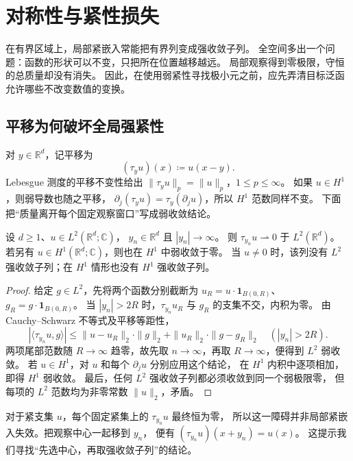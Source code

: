\section{对称性与紧性损失}
\label{b2:sec:app-F-1}

在有界区域上，局部紧嵌入常能把有界列变成强收敛子列。
全空间多出一个问题：函数的形状可以不变，只把所在位置越移越远。
局部观察得到零极限，守恒的总质量却没有消失。
因此，在使用弱紧性寻找极小元之前，应先弄清目标泛函允许哪些不改变数值的变换。

\subsection{平移为何破坏全局强紧性}
\label{b2:subsec:F0101}

对 \(y\in\mathbb R^d\)，记平移为
\[
 (\tau_yu)(x)\coloneqq u(x-y).
\]
Lebesgue 测度的平移不变性给出
\(\|\tau_yu\|_p=\|u\|_p\)，\(1\le p\le\infty\)。
如果 \(u\in H^1\)，则弱导数也随之平移，
\(\partial_j(\tau_yu)=\tau_y(\partial_ju)\)，所以 \(H^1\) 范数同样不变。
下面把“质量离开每个固定观察窗口”写成弱收敛结论。

\begin{proposition}[平移列的弱极限]
\label{b2:prop:F-translation-loss}
设 \(d\ge1\)、\(u\in L^2(\mathbb R^d;\mathbb C)\)，
\(y_n\in\mathbb R^d\) 且 \(|y_n|\to\infty\)。
则 \(\tau_{y_n}u\rightharpoonup0\) 于 \(L^2(\mathbb R^d)\)。
若另有 \(u\in H^1(\mathbb R^d;\mathbb C)\)，则也在 \(H^1\) 中弱收敛于零。
当 \(u\ne0\) 时，该列没有 \(L^2\) 强收敛子列；在 \(H^1\) 情形也没有 \(H^1\) 强收敛子列。
\end{proposition}
\begin{proof}
给定 \(g\in L^2\)，先将两个函数分别截断为
\(u_R=u\cdot\mathbf1_{B(0,R)}\)、
\(g_R=g\cdot\mathbf1_{B(0,R)}\)。
当 \(|y_n|>2R\) 时，\(\tau_{y_n}u_R\) 与 \(g_R\) 的支集不交，内积为零。
由 Cauchy--Schwarz 不等式及平移等距性，
\[
 \left|\langle\tau_{y_n}u,g\rangle\right|
 \le\|u-u_R\|_2\cdot\|g\|_2
     +\|u_R\|_2\cdot\|g-g_R\|_2
 \quad (|y_n|>2R).
\]
两项尾部范数随 \(R\to\infty\) 趋零，故先取 \(n\to\infty\)，再取
\(R\to\infty\)，便得到 \(L^2\) 弱收敛。
若 \(u\in H^1\)，对 \(u\) 和每个 \(\partial_ju\) 分别应用这个结论，
在 \(H^1\) 内积中逐项相加，即得 \(H^1\) 弱收敛。
最后，任何 \(L^2\) 强收敛子列都必须收敛到同一个弱极限零，
但每项的 \(L^2\) 范数均为非零常数 \(\|u\|_2\)，矛盾。
\end{proof}
对于紧支集 \(u\)，每个固定紧集上的 \(\tau_{y_n}u\) 最终恒为零，
所以这一障碍并非局部紧嵌入失效。把观察中心一起移到 \(y_n\)，
便有 \((\tau_{y_n}u)(x+y_n)=u(x)\)。
这提示我们寻找“先选中心，再取强收敛子列”的结论。

